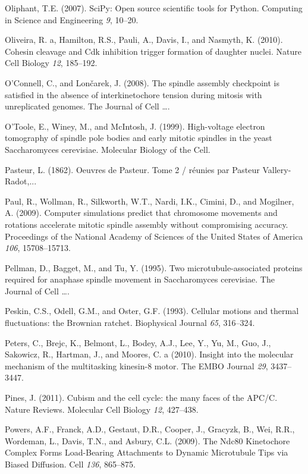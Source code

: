 \documentclass[12pt,a4paper,twoside,openright]{book}
\begin{document}
\hypertarget{ref-Oliphant2007}{}
Oliphant, T.E. (2007). SciPy: Open source scientific tools for Python.
Computing in Science and Engineering \emph{9}, 10--20.

\hypertarget{ref-Oliveira2010}{}
Oliveira, R. a, Hamilton, R.S., Pauli, A., Davis, I., and Nasmyth, K.
(2010). Cohesin cleavage and Cdk inhibition trigger formation of
daughter nuclei. Nature Cell Biology \emph{12}, 185--192.

\hypertarget{ref-OConnell2008}{}
O'Connell, C., and Lončarek, J. (2008). The spindle assembly checkpoint
is satisfied in the absence of interkinetochore tension during mitosis
with unreplicated genomes. The Journal of Cell \ldots{}.

\hypertarget{ref-OToole1999}{}
O'Toole, E., Winey, M., and McIntosh, J. (1999). High-voltage electron
tomography of spindle pole bodies and early mitotic spindles in the
yeast Saccharomyces cerevisiae. Molecular Biology of the Cell.

\hypertarget{ref-Pasteur}{}
Pasteur, L. (1862). Oeuvres de Pasteur. Tome 2 / réunies par Pasteur
Vallery-Radot,...

\hypertarget{ref-Paul2009}{}
Paul, R., Wollman, R., Silkworth, W.T., Nardi, I.K., Cimini, D., and
Mogilner, A. (2009). Computer simulations predict that chromosome
movements and rotations accelerate mitotic spindle assembly without
compromising accuracy. Proceedings of the National Academy of Sciences
of the United States of America \emph{106}, 15708--15713.

\hypertarget{ref-Pellman1995}{}
Pellman, D., Bagget, M., and Tu, Y. (1995). Two microtubule-associated
proteins required for anaphase spindle movement in Saccharomyces
cerevisiae. The Journal of Cell \ldots{}.

\hypertarget{ref-Peskin1993}{}
Peskin, C.S., Odell, G.M., and Oster, G.F. (1993). Cellular motions and
thermal fluctuations: the Brownian ratchet. Biophysical Journal
\emph{65}, 316--324.

\hypertarget{ref-Peters2010}{}
Peters, C., Brejc, K., Belmont, L., Bodey, A.J., Lee, Y., Yu, M., Guo,
J., Sakowicz, R., Hartman, J., and Moores, C. a (2010). Insight into the
molecular mechanism of the multitasking kinesin-8 motor. The EMBO
Journal \emph{29}, 3437--3447.

\hypertarget{ref-Pines2011}{}
Pines, J. (2011). Cubism and the cell cycle: the many faces of the
APC/C. Nature Reviews. Molecular Cell Biology \emph{12}, 427--438.

\hypertarget{ref-Powers2009a}{}
Powers, A.F., Franck, A.D., Gestaut, D.R., Cooper, J., Gracyzk, B., Wei,
R.R., Wordeman, L., Davis, T.N., and Asbury, C.L. (2009). The Ndc80
Kinetochore Complex Forms Load-Bearing Attachments to Dynamic
Microtubule Tips via Biased Diffusion. Cell \emph{136}, 865--875.
\end{document}
